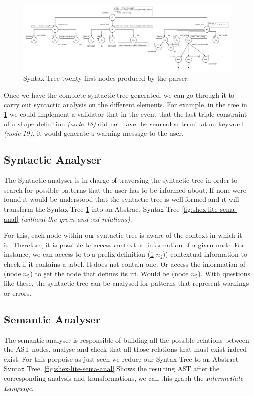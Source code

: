 \begin{figure}
    \includegraphics[width=\textwidth]{images/shex-lite-syntax-tree.pdf}
    \centering
    \caption[Syntax Tree twenty first nodes produced by the parser]{Syntax Tree twenty first nodes produced by the parser.}
    \label{fig:shex-lite-st}
\end{figure}

Once we have the complete syntactic tree generated, we can go through it to carry out syntactic analysis on the different elements.
For example, in the tree in \cref{fig:shex-lite-st} we could implement a validator that in the event that the last triple constraint
of a shape definition \textit{(node 16)} did not have the semicolon termination keyword \textit{(node 19)}, it would generate a
warning message to the user.

\subsection{Syntactic Analyser}
The Syntactic analyser is in charge of traversing the syntactic tree in order to search for possible patterns that the user has to
be informed about. If none were found it would be understood that the syntactic tree is well formed and it will transform the Syntax Tree
\cref{fig:shex-lite-st} into an Abstract Syntax Tree \cref{fig:shex-lite-sema-anal} \textit{(without the green and red relations)}.

For this, each node within our syntactic tree is aware of the context in which it is. Therefore, it is possible to access contextual
information of a given node. For instance, we can access to to a prefix definition (\cref{fig:shex-lite-st} $n_2$)) contextual
information to check if it contains a label. It does not contain one. Or access the information of (node $n_5$) to get the
node that defines its iri. Would be (node $n_5$). With questions like these, the syntactic tree can be analysed for patterns that
represent warnings or errors.

\subsection{Semantic Analyser}
The semantic analyser is responsible of building all the possible relations between the AST nodes, analyse and check that
all those relations that must exist indeed exist. For this porpoise as just seen we reduce our Syntax Tree to an
Abstract Syntax Tree. \cref{fig:shex-lite-sema-anal} Shows the resulting AST after the corresponding analysis and
transformations, we call this graph the \textit{Intermediate Language}.

